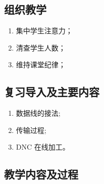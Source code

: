 \jxhj{%
	}

\makeshouye %

\subsection{组织教学}
\begin{enumerate}[\hspace{2em}1、]
	\item 集中学生注意力；
	\item 清查学生人数；
	\item 维持课堂纪律；
\end{enumerate}
\subsection{复习导入及主要内容}
\begin{enumerate}[1、]
	\item 数据线的接法;
	\item 传输过程;
	\item DNC 在线加工。
\end{enumerate}


\subsection{教学内容及过程}

